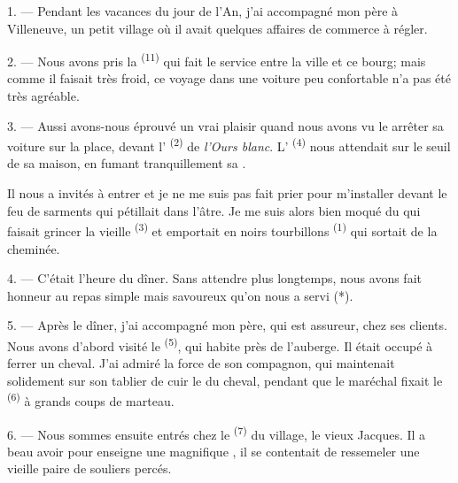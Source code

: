 \VUsaut{3.0mm}

\VUsaut{4.0mm}

1. --- Pendant les vacances du jour de l'An, j'ai accompagné mon père à
Villeneuve, un petit village où il avait quelques affaires de commerce à régler.

2. --- Nous avons pris la  \textsuperscript{(11)} qui fait le
service entre la ville et ce bourg; mais comme il faisait très froid, ce voyage
dans une voiture peu confortable n'a pas été très agréable.

3. --- Aussi avons-nous éprouvé un vrai plaisir quand nous avons vu le
 arrêter sa voiture sur la place, devant l'
\textsuperscript{(2)} de \textit{l'Ours blanc}. L'
\textsuperscript{(4)} nous attendait sur le seuil de sa maison, en fumant
tranquillement sa .

Il nous a invités à entrer et je ne me suis pas fait prier pour m'installer
devant le feu de sarments qui pétillait dans l'âtre. Je me suis alors bien moqué
du  qui faisait grincer la vieille 
\textsuperscript{(3)} et emportait en noirs tourbillons 
\textsuperscript{(1)} qui sortait de la cheminée.

4. --- C'était l'heure du dîner. Sans attendre plus longtemps, nous avons fait
honneur au repas simple mais savoureux qu'on nous a servi (*).

\VUsaut{3.0mm}

5. --- Après le dîner, j'ai accompagné mon père, qui est assureur, chez ses
clients. Nous avons d'abord visité le 
\textsuperscript{(5)}, qui habite près de l'auberge. Il était occupé à ferrer un
cheval. J'ai admiré la force de son compagnon, qui maintenait solidement sur son
tablier de cuir le  du cheval, pendant que le maréchal fixait le
 \textsuperscript{(6)} à grands coups de marteau.

6. --- Nous sommes ensuite entrés chez le 
\textsuperscript{(7)} du village, le vieux Jacques. Il a beau avoir pour
enseigne une magnifique , il se contentait de ressemeler une
vieille paire de souliers percés.

